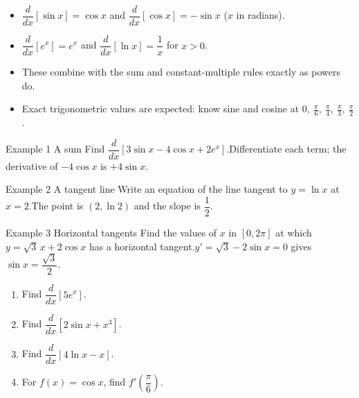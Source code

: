 \documentclass[11pt]{article}
\begin{document}

\begin{ideabox}
\begin{itemize}[leftmargin=*,itemsep=2pt,topsep=2pt]
  \item $\dfrac{d}{dx}[\sin x]=\cos x$ \quad and \quad $\dfrac{d}{dx}[\cos x]=-\sin x$ \quad ($x$ in radians).
  \item $\dfrac{d}{dx}\left[e^{x}\right]=e^{x}$ \quad and \quad $\dfrac{d}{dx}[\ln x]=\dfrac1x$ for $x>0$.
  \item These combine with the sum and constant-multiple rules exactly as powers do.
  \item Exact trigonometric values are expected: know sine and cosine at $0,\ \tfrac\pi6,\ \tfrac\pi4,\ \tfrac\pi3,\ \tfrac\pi2$.
\end{itemize}
\end{ideabox}

\begin{example}{Example 1 \textperiodcentered{} A sum}
Find $\dfrac{d}{dx}\left[3\sin x-4\cos x+2e^{x}\right]$.\soln Differentiate each term; the derivative of $-4\cos x$ is $+4\sin x$.
\end{example}

\begin{example}{Example 2 \textperiodcentered{} A tangent line}
Write an equation of the line tangent to $y=\ln x$ at $x=2$.\soln The point is $(2,\ln2)$ and the slope is $\dfrac12$.
\end{example}

\begin{example}{Example 3 \textperiodcentered{} Horizontal tangents}
Find the values of $x$ in $[0,2\pi]$ at which $y=\sqrt3\,x+2\cos x$ has a horizontal tangent.\soln $y'=\sqrt3-2\sin x=0$ gives $\sin x=\dfrac{\sqrt3}{2}$.
\end{example}

\newpage
{}

\begin{enumerate}[leftmargin=*,itemsep=2pt]
  \item Find $\dfrac{d}{dx}\left[5e^{x}\right]$.\work{2.3cm}
  \item Find $\dfrac{d}{dx}\left[2\sin x+x^3\right]$.\work{2.3cm}
  \item Find $\dfrac{d}{dx}\left[4\ln x-x\right]$.\work{2.3cm}
  \item For $f(x)=\cos x$, find $f'\!\left(\dfrac\pi6\right)$.\work{2.3cm}
\end{enumerate}
\end{document}
